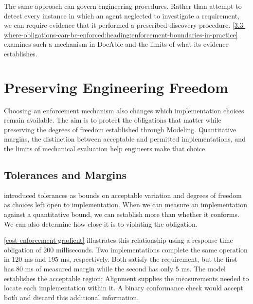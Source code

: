 
The same approach can govern engineering procedures. Rather than attempt to detect every instance in which an agent neglected to investigate a requirement, we can require evidence that it performed a prescribed discovery procedure. \autoref{3.3-where-obligations-can-be-enforced:heading:enforcement-boundaries-in-practice} examines such a mechanism in DocAble and the limits of what its evidence establishes.

\section{Preserving Engineering Freedom}\label{heading:preserving-engineering-freedom}

Choosing an enforcement mechanism also changes which implementation choices remain available. The aim is to protect the obligations that matter while preserving the degrees of freedom established through Modeling. Quantitative margins, the distinction between acceptable and permitted implementations, and the limits of mechanical evaluation help engineers make that choice.

\subsection{Tolerances and Margins}\label{heading:margin-and-engineering-freedom}



 introduced tolerances as bounds on acceptable variation and degrees of freedom as choices left open to implementation. When we can measure an implementation against a quantitative bound, we can establish more than whether it conforms. We can also determine how close it is to violating the obligation.

\autoref{cost-enforcement-gradient} illustrates this relationship using a response-time obligation of 200 milliseconds. Two implementations complete the same operation in 120 ms and 195 ms, respectively. Both satisfy the requirement, but the first has 80 ms of measured margin while the second has only 5 ms. The model establishes the acceptable region; Alignment supplies the measurements needed to locate each implementation within it. A binary conformance check would accept both and discard this additional information.

